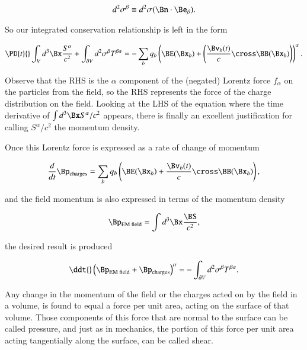 \begin{equation}\label{eqn:relativisticElectrodynamicsPS6P1:250}
d^2 \sigma^\beta \equiv d^2 \sigma (\Bn \cdot \Be_\beta).
\end{equation}

So our integrated conservation relationship is left in the form

\begin{equation}\label{eqn:relativisticElectrodynamicsPS6P1:270}
\PD{t}{} \int_V d^3 \Bx \frac{S^\alpha}{c^2} 
+ 
\int_{\partial V} d^2 \sigma^\beta T^{\beta \alpha}
= -
\sum_b q_b \left( \BE(\Bx_b) + \left( \frac{\Bv_b(t)}{c} \cross \BB(\Bx_b) \right) \right)^\alpha .
\end{equation}

Observe that the RHS is the $\alpha$ component of the (negated) Lorentz force $f_\alpha$ on the particles from the field, so the RHS represents the force of the charge distribution on the field.  Looking at the LHS of the equation where the time derivative of $\int d^3\Bx S^\alpha/c^2$ appears, there is finally an excellent justification for calling $S^\alpha/c^2$ the momentum density.

Once this Lorentz force is expressed as a rate of change of momentum

\begin{equation}\label{eqn:relativisticElectrodynamicsPS6P1:290}
\frac{d}{dt} \Bp_{\text{charges}} = \sum_b q_b \left( \BE(\Bx_b) + \frac{\Bv_b(t)}{c} \cross \BB(\Bx_b) \right),
\end{equation}

and the field momentum is also expressed in terms of the momentum density

\begin{equation}\label{eqn:relativisticElectrodynamicsPS6P1:310}
\Bp_{\text{EM field}} = \int d^3 \Bx \frac{\BS}{c^2},
\end{equation}

the desired result is produced

\begin{equation}\label{eqn:relativisticElectrodynamicsPS6P1:330}
\ddt{} \left( \Bp_{\text{EM field}} + \Bp_{\text{charges}} \right)^\alpha = -\int_{\partial V} d^2 \sigma^\beta T^{\beta \alpha}.
\end{equation}

Any change in the momentum of the field or the charges acted on by the field in a volume, is found to equal a force per unit area, acting on the surface of that volume.  Those components of this force that are normal to the surface can be called pressure, and just as in mechanics, the portion of this force per unit area acting tangentially along the surface, can be called shear.

